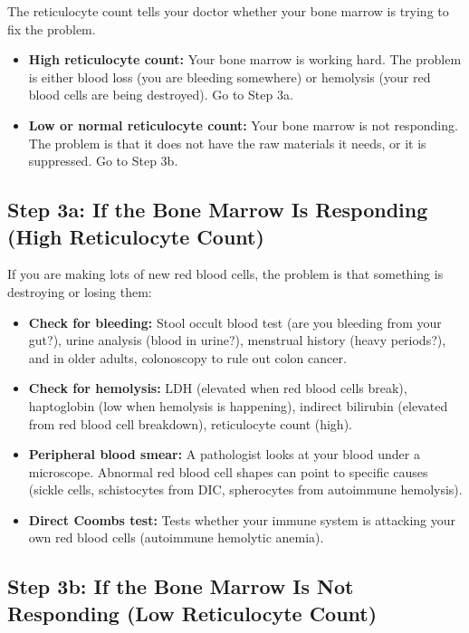 The reticulocyte count tells your doctor whether your bone marrow is trying to fix the problem.

\begin{itemize}
    \item \textbf{High reticulocyte count:} Your bone marrow is working hard. The problem is either blood loss (you are bleeding somewhere) or hemolysis (your red blood cells are being destroyed). Go to Step 3a.
    \item \textbf{Low or normal reticulocyte count:} Your bone marrow is not responding. The problem is that it does not have the raw materials it needs, or it is suppressed. Go to Step 3b.
\end{itemize}

\subsection{Step 3a: If the Bone Marrow Is Responding (High Reticulocyte Count)}

If you are making lots of new red blood cells, the problem is that something is destroying or losing them:

\begin{itemize}
    \item \textbf{Check for bleeding:} Stool occult blood test (are you bleeding from your gut?), urine analysis (blood in urine?), menstrual history (heavy periods?), and in older adults, colonoscopy to rule out colon cancer.
    \item \textbf{Check for hemolysis:} LDH (elevated when red blood cells break), haptoglobin (low when hemolysis is happening), indirect bilirubin (elevated from red blood cell breakdown), reticulocyte count (high).
    \item \textbf{Peripheral blood smear:} A pathologist looks at your blood under a microscope. Abnormal red blood cell shapes can point to specific causes (sickle cells, schistocytes from DIC, spherocytes from autoimmune hemolysis).
    \item \textbf{Direct Coombs test:} Tests whether your immune system is attacking your own red blood cells (autoimmune hemolytic anemia).
\end{itemize}

\subsection{Step 3b: If the Bone Marrow Is Not Responding (Low Reticulocyte Count)}

